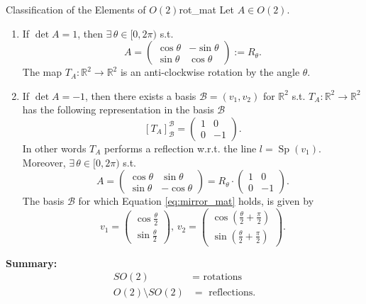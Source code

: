 \begin{proposition}{Classification of the Elements of $O(2)$}{rot_mat}
	Let $A \in O(2)$.
	\begin{enumerate}
		\item If $\det A = 1$, then $\exists \, \theta \in [0, 2\pi)$ s.t.
		\[
			A = \begin{pmatrix}
				\cos \theta & -\sin \theta\\
				\sin \theta & \cos \theta
			\end{pmatrix} := R_{\theta}.
		\]
		The map $T_A:\mathbb{R}^2 \to \mathbb{R}^2$ is an anti-clockwise rotation by the angle $\theta$.
		\item If $\det A = -1$, then there exists a basis $\mathcal{B} = (v_1, v_2)$ for $\mathbb{R}^2$ s.t. $T_A: \mathbb{R}^2 \to \mathbb{R}^2$ has the following representation in the basis $\mathcal{B}$
		\begin{equation}
			\label{eq:mirror_mat}
			[T_A]^{\mathcal{B}}_{\mathcal{B}} = \begin{pmatrix}
				1 & 0\\
				0 & -1
			\end{pmatrix}.
		\end{equation}
		In other words $T_A$ performs a reflection w.r.t. the line $l = \operatorname{Sp}(v_1)$. Moreover, $\exists \, \theta \in [0, 2\pi)$ s.t. 
		\[
			A = \begin{pmatrix}
				\cos \theta & \sin \theta\\
				\sin \theta & - \cos \theta
			\end{pmatrix} 
			= R_{\theta} \cdot \begin{pmatrix}
				1 & 0 \\
				0 & -1
			\end{pmatrix}.
		\]
		The basis $\mathcal{B}$ for which Equation \eqref{eq:mirror_mat} holds, is given by
		\[
			v_1 = \begin{pmatrix}
				\cos \tfrac{\theta}{2}\\
				\sin \tfrac{\theta}{2}
			\end{pmatrix}, \, 
			v_2 = \begin{pmatrix}
				\cos(\tfrac{\theta}{2} + \tfrac{\pi}{2})\\
				\sin (\tfrac{\theta}{2} + \tfrac{\pi}{2})
			\end{pmatrix}.
		\]
	\end{enumerate}
\end{proposition}

\textbf{Summary:}
\begin{align*}
	SO(2) &= \text{ rotations}\\
	O(2) \setminus SO(2) &= \text{ reflections}.
\end{align*}

